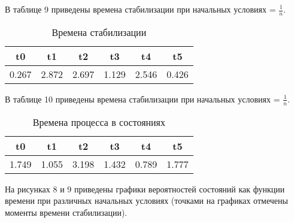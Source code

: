 В таблице 9 приведены времена стабилизации при начальных условиях = $\frac{1}{n}$.
\begin{table}[h!]
	\centering
	\caption{Времена стабилизации}
	\begin{tabular}{|c c c c c c|} 
		\hline
		t0 & t1 & t2  & t3 & t4 & t5 \\ [0.5ex] 
		\hline
		0.267 & 2.872 & 2.697 & 1.129 & 2.546 & 0.426 \\ [0.5ex] 
		\hline
	\end{tabular}
\end{table}

В таблице 10 приведены времена стабилизации при начальных условиях = $\frac{1}{n}$.
\begin{table}[h!]
	\centering
	\caption{Времена процесса в состояниях}
	\begin{tabular}{|c c c c c c|} 
	\hline
	t0 & t1 & t2  & t3 & t4 & t5 \\ [0.5ex] 
	\hline
	1.749 & 1.055 & 3.198 & 1.432 & 0.789 & 1.777 \\ [0.5ex] 
	\hline
\end{tabular}
\end{table}

На рисунках 8 и 9 приведены графики вероятностей состояний как функции времени при различных начальных условиях (точками на графиках отмечены моменты времени стабилизации).
